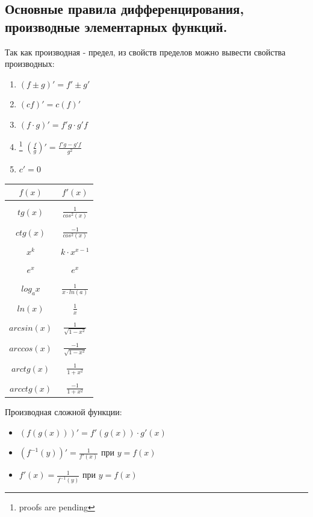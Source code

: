 \documentclass[oneside]{book}
\begin{document}
\begin{enumerate}
\chapter[правила дифференцирования]{Основные правила дифференцирования, производные элементарных функций.}
Так как производная - предел, из свойств пределов можно вывести свойства производных:
\begin{enumerate}
  \item $(f \pm g)' = f' \pm g'$
  \item $(cf)' = c(f)'$
  \item $(f \cdot g)' = f'g \cdot g'f$
  \item\footnote{proofs are pending} $(\frac{f}{g})' = \frac{f'g - g'f}{g^2}$
  \item $c' = 0$
\end{enumerate}
  \begin{center}
      \begin{tabular}{c|c}
        $f(x)$ & $f'(x)$ \\
        \hline \\
        $tg(x)$ & $\frac{1}{cos^2(x)}$ \\
          \hline \\
        $ctg(x)$ & $\frac{-1}{cos^2(x)}$ \\
          \hline \\
        $x^k$ & $k \cdot x^{x-1}$ \\
          \hline \\
        $e^x$ & $e^x$ \\
          \hline \\
        $log_a x$ & $\frac{1}{x \cdot ln(a)}$ \\
          \hline \\
        $ln(x)$ & $\frac{1}{x}$ \\
          \hline \\
        $arcsin(x)$ & $\frac{1}{\sqrt{1 - x^2}}$ \\
          \hline \\
        $arccos(x)$ & $\frac{-1}{\sqrt{1 - x^2}}$ \\
          \hline \\
        $arctg(x)$ & $\frac{1}{1 + x^2}$ \\
          \hline \\
        $arcctg(x)$ & $\frac{-1}{1 + x^2}$ \\
      \end{tabular}
  \end{center}
Производная сложной функции:
\begin{itemize}
  \item $(f(g(x)))' = f'(g(x)) \cdot g'(x)$
  \item $(f^{-1}(y))' = \frac{1}{f'(x)}$ при $y = f(x)$
  \item $f'(x) = \frac{1}{f^{-1}(y)}$ при $y = f(x)$



\end{itemize}
\end{enumerate}
\end{document}
